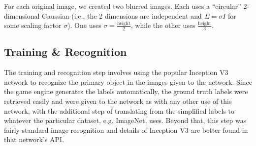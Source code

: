For each original image, we created two blurred images. Each uses a ``circular''
2-dimensional Gaussian (i.e., the 2 dimensions are independent and \(\Sigma =
\sigma I\) for some scaling factor \(\sigma\)). One uses \(\sigma =
\frac{\text{height}}{2}\), while the other uses \(\frac{\text{height}}{3}\).
\vspace{-1em}
\subsection{Training \& Recognition}
The training and recognition step involves using the popular Inception V3
network to recognize the primary object in the images given to the network.
Since the game engine generates the labels automatically, the ground truth
labels were retrieved easily and were given to the network as with any other use
of this network, with the additional step of translating from the simplified labels to whatever the particular dataset, e.g. ImageNet, uses. Beyond that, this step was fairly standard image recognition and
details of Inception V3 are better found in that network's API\@.